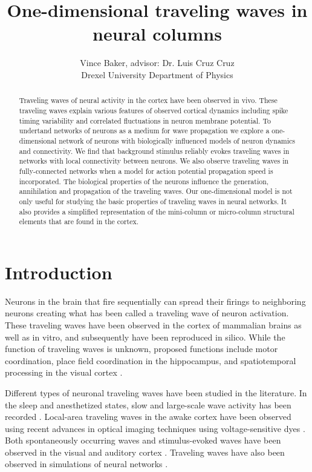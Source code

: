 \documentclass[a4paper,11pt]{article}
\title{One-dimensional traveling waves in neural columns}
\author{Vince Baker, advisor: Dr. Luis Cruz Cruz\\ Drexel University Department of Physics}
\begin{document}
\maketitle

\begin{abstract}
Traveling waves of neural activity in the cortex have been observed in vivo.
These traveling waves explain various features of observed cortical dynamics including spike timing variability and correlated fluctuations in neuron membrane potential.
To undertand networks of neurons as a medium for wave propagation we explore a one-dimensional network of neurons with biologically influenced models of neuron dynamics and connectivity.
We find that background stimulus reliably evokes traveling waves in networks with local connectivity between neurons.
We also observe traveling waves in fully-connected networks when a model for action potential propagation speed is incorporated.
The biological properties of the neurons influence the generation, annihilation and propagation of the traveling waves. 
Our one-dimensional model is not only useful for studying the basic properties of traveling waves in neural networks.
It also provides a simplified representation of the mini-column or micro-column structural elements that are found in the cortex.

\end{abstract}

\section{Introduction} 
Neurons in the brain that fire sequentially can spread their firings to neighboring neurons creating what has been called a traveling wave of neuron activation. 
These traveling waves have been observed in the cortex of mammalian brains as well as in vitro, and subsequently have been reproduced in silico. 
While the function of traveling waves is unknown, proposed functions include motor coordination, place field coordination in the hippocampus, and spatiotemporal processing in the visual cortex \cite{muller2018}. 

Different types of neuronal traveling waves have been studied in the literature. 
In the sleep and anesthetized states, slow and large-scale wave activity has been recorded \cite{muller2018}. 
Local-area traveling waves in the awake cortex have been observed using recent advances in optical imaging techniques using voltage-sensitive dyes \cite{wu2008}. 
Both spontaneously occurring waves and stimulus-evoked waves have been observed in the visual and auditory cortex \cite{reimer2010}\cite{muller2018}.
Traveling waves have also been observed in simulations of neural networks \cite{keane2015}.
\end{document}
